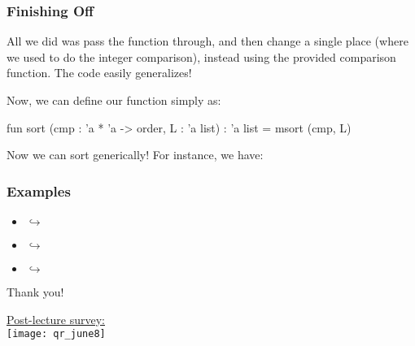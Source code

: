 \documentclass[aspectratio=169, handout]{beamer}
\begin{document}
\begin{frame}[fragile]
  \frametitle{Finishing Off }


  All we did was pass the  function through, and then change a 
  single place (where we used to do the integer comparison), instead using
  the provided comparison function. The code easily generalizes!

  \vspace{\fill}

  Now, we can define our  function simply as:

  \pause
  \vspace{\fill}

  \begin{codeblock}
    fun sort (cmp : 'a * 'a -> order, L : 'a list) : 'a list = msort (cmp, L) 
  \end{codeblock}

  \pause
  \vspace{\fill}

  Now we can sort generically! For instance, we have:
\end{frame}

\begin{frame}[fragile]
  \frametitle{ Examples}

  \begin{itemize}
    \item {} $\hookrightarrow$ \code{[1, 2, 3]}
    \item {} $\hookrightarrow$ \code{["a", "b", "ab"]}
    \item {} $\hookrightarrow$ \code{[3, 2, 1]}
  \end{itemize}
\end{frame}

\begin{frame}[plain]
	\begin{center} Thank you! \end{center}

	\begin{center} 
    {\color{blue} \href{https://docs.google.com/forms/d/e/1FAIpQLSf9z0VuNTzebKdD29dw3k4sdp-SR8fQhxDoeBbZ7dSsMKtO5w/viewform?usp=sf_link}{Post-lecture survey:}} \\
    \vspace{5pt}
    \texttt{[image: qr\_june8]}
  \end{center}
\end{frame}
\end{document}
